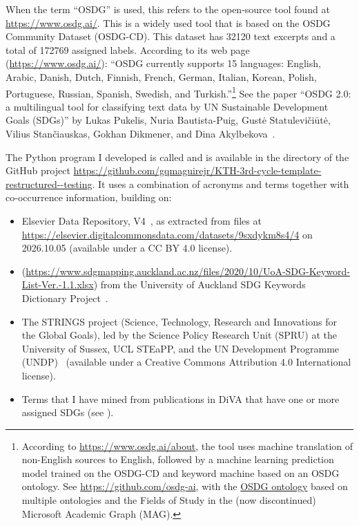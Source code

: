 When the term \enquote{OSDG} is used, this refers to the open-source tool found at \href{https://www.osdg.ai/}{https://www.osdg.ai/}. This is a widely used tool that is based on the OSDG Community Dataset (OSDG-CD)\cite{osdg_2021_5550238}. This dataset has \num{32120} text excerpts and a total of \num{172769} assigned labels. According to its web page (\url{https://www.osdg.ai/}): \enquote{OSDG currently supports 15 languages: English, Arabic, Danish, Dutch, Finnish, French, German, Italian, Korean, Polish, Portuguese, Russian, Spanish, Swedish, and Turkish.}\footnote{According to \href{https://www.osdg.ai/about}{https://www.osdg.ai/about}, the tool uses machine translation of \mbox{non-English} sources to English, followed by a machine learning prediction model trained on the OSDG-CD and keyword machine based on an OSDG ontology. See \href{https://github.com/osdg-ai}{https://github.com/osdg-ai}, with the \href{https://github.com/osdg-ai/osdg-mappingi}{OSDG ontology} based on multiple ontologies and the Fields of Study in the (now discontinued) Microsoft Academic Graph (MAG).} See the paper \enquote{OSDG 2.0: a multilingual tool for classifying text data by UN Sustainable Development Goals (SDGs)} by 
Lukas Pukelis, Nuria Bautista-Puig, Gustė Statulevičiūtė, Vilius Stančiauskas, Gokhan Dikmener, and Dina Akylbekova~\cite{pukelis2022osdg20multilingualtool}.

The Python program I developed is called  and is available in the  directory of the GitHub project \url{https://github.com/gqmaguirejr/KTH-3rd-cycle-template-restructured--testing}. It uses a combination of acronyms and terms together with \mbox{co-occurrence} information, building on:
\begin{itemize}
    \item Elsevier Data Repository, V4~\cite{Rivest2021_SDG}, as extracted from files at \url{https://elsevier.digitalcommonsdata.com/datasets/9sxdykm8s4/4} on 2026.10.05 (available under a CC BY 4.0 license).

    \item {} (\url{https://www.sdgmapping.auckland.ac.nz/files/2020/10/UoA-SDG-Keyword-List-Ver.-1.1.xlsx}) from the University of Auckland SDG Keywords Dictionary Project~\cite{Wang2023_UoA_SDG_Mapping}.

    \item The STRINGS project (Science, Technology, Research and Innovations for the Global Goals), led by the Science Policy Research Unit (SPRU) at the University of Sussex, UCL STEaPP, and the \gls{UN} Development Programme (UNDP)~\cite{Confraria2024_STRINGS_SDG} (available under a Creative Commons Attribution 4.0 International license).

    \item Terms that I have mined from publications in \gls{DiVA} that have one or more assigned \glspl{SDG} (see ).
\end{itemize}


